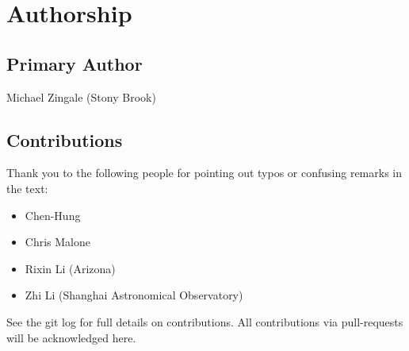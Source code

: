 \clearpage

\section*{Authorship}

\subsection*{Primary Author}

Michael Zingale (Stony Brook)


\subsection*{Contributions}

Thank you to the
following people for pointing out typos or confusing remarks in the text:
\begin{itemize}
\item Chen-Hung
\item Chris Malone 
\item Rixin Li (Arizona)
\item Zhi Li (Shanghai Astronomical Observatory)
\end{itemize}

See the git log for full details on contributions.  All contributions
via pull-requests will be acknowledged here.

